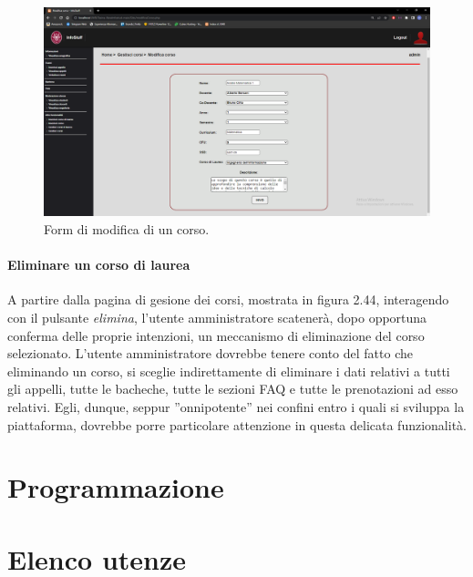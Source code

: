 \documentclass [a4paper,11pt]{book}
\begin{document}
\begin{figure}
\centering
\includegraphics[scale=0.3]{figura2-45.png}
\caption{Form di modifica di un corso.}
\end{figure}

\medskip

\subsubsection{Eliminare un corso di laurea}

A partire dalla pagina di gesione dei corsi, mostrata in figura 2.44, interagendo con il pulsante \emph{elimina}, l'utente amministratore scatenerà, dopo opportuna conferma delle proprie intenzioni, un meccanismo di eliminazione del corso selezionato. L'utente amministratore dovrebbe tenere conto del fatto che eliminando un corso, si sceglie indirettamente di eliminare i dati relativi a tutti gli appelli, tutte le bacheche, tutte le sezioni FAQ e tutte le prenotazioni ad esso relativi. Egli, dunque, seppur ''onnipotente'' nei confini entro i quali si sviluppa la piattaforma, dovrebbe porre particolare attenzione in questa delicata funzionalità.

\medskip
\medskip

\chapter{Programmazione}

\chapter{Elenco utenze}
\end{document}
